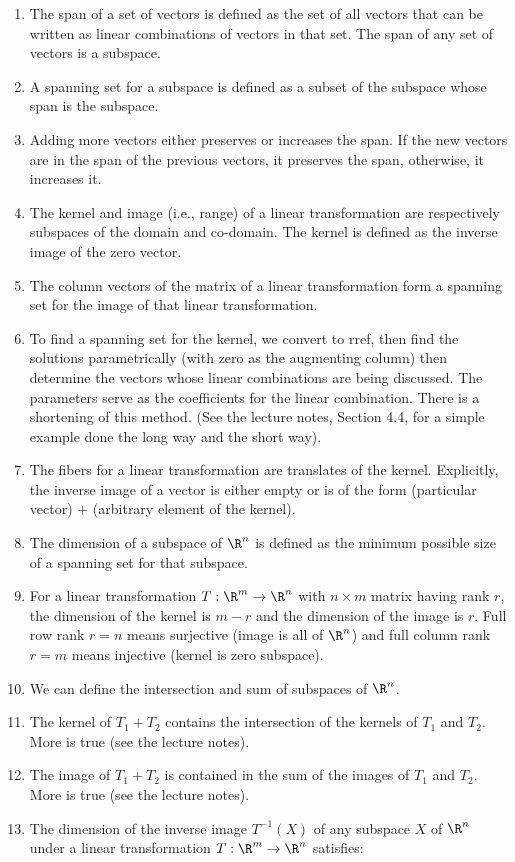 \documentclass[10pt]{amsart}
\begin{document}
\begin{enumerate}
\item The span of a set of vectors is defined as the set of all
  vectors that can be written as linear combinations of vectors in
  that set. The span of any set of vectors is a subspace.
\item A spanning set for a subspace is defined as a subset of the
  subspace whose span is the subspace.
\item Adding more vectors either preserves or increases the span. If
  the new vectors are in the span of the previous vectors, it
  preserves the span, otherwise, it increases it.
\item The kernel and image (i.e., range) of a linear transformation
  are respectively subspaces of the domain and co-domain. The kernel
  is defined as the inverse image of the zero vector.
\item The column vectors of the matrix of a linear transformation form
  a spanning set for the image of that linear transformation.
\item To find a spanning set for the kernel, we convert to rref, then
  find the solutions parametrically (with zero as the augmenting
  column) then determine the vectors whose linear combinations are
  being discussed. The parameters serve as the coefficients for the
  linear combination. There is a shortening of this method. (See the
  lecture notes, Section 4.4, for a simple example done the long way
  and the short way).
\item The fibers for a linear transformation are translates of the
  kernel. Explicitly, the inverse image of a vector is either empty or
  is of the form (particular vector) + (arbitrary element of the
  kernel).
\item The dimension of a subspace of $\R^n$ is defined as the minimum
  possible size of a spanning set for that subspace.
\item For a linear transformation $T:\R^m \to \R^n$ with $n \times m$
  matrix having rank $r$, the dimension of the kernel is $m - r$ and
  the dimension of the image is $r$. Full row rank $r = n$ means
  surjective (image is all of $\R^n$) and full column rank $r = m$
  means injective (kernel is zero subspace).
\item We can define the intersection and sum of subspaces of $\R^n$.
\item The kernel of $T_1 + T_2$ contains the intersection of the
  kernels of $T_1$ and $T_2$. More is true (see the lecture notes).
\item The image of $T_1 + T_2$ is contained in the sum of the images
  of $T_1$ and $T_2$. More is true (see the lecture notes).
\item The dimension of the inverse image $T^{-1}(X)$ of any subspace $X$
  of $\R^n$ under a linear transformation $T:\R^m \to \R^n$ satisfies:


\end{enumerate}
\end{document}
